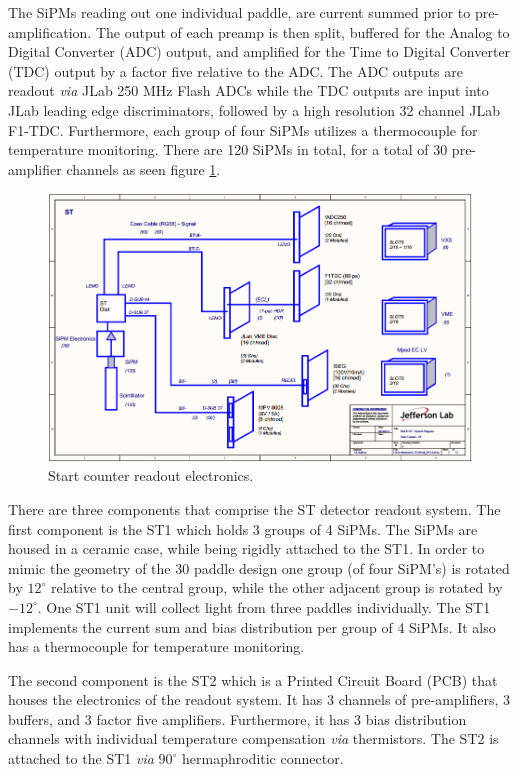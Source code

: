 The SiPMs reading out one individual paddle, are current summed prior to pre-amplification.  The output of each preamp is then split, buffered for the Analog to Digital Converter (ADC) output, and amplified for the Time to Digital Converter (TDC) output by a factor five relative to the ADC.  The ADC outputs are readout \emph{via} JLab 250 MHz Flash ADCs while the TDC outputs are input into JLab leading edge discriminators, followed by a high resolution 32 channel JLab F1-TDC.  Furthermore, each group of four SiPMs utilizes a thermocouple for temperature monitoring. There are 120 SiPMs in total, for a total of 30 pre-amplifier channels as seen figure \ref{fig:Start Counter Electronics}.
\begin{figure}[!htb]
	\centering
	\includegraphics[width=1.0\columnwidth]{design/figs/ST_Electronics}
	\caption[Start counter readout electronics]{Start counter readout electronics.}
	\label{fig:Start Counter Electronics}
\end{figure}

There are three components that comprise the ST detector readout system.  The first component is the ST1 which holds 3 groups of 4 SiPMs.  The SiPMs are housed in a ceramic case, while being rigidly attached to the ST1.  In order to mimic the geometry of the 30 paddle design one group (of four SiPM's) is rotated by $12^{\circ}$ relative to the central group, while the other adjacent group is rotated by $-12^{\circ}$.  One ST1 unit will collect light from three paddles individually.  The ST1 implements the current sum and bias distribution per group of 4 SiPMs.  It also has a thermocouple for temperature monitoring.  

The second component is the ST2 which is a Printed Circuit Board (PCB) that houses the electronics of the readout system.  It has 3 channels of pre-amplifiers, 3 buffers, and 3 factor five amplifiers.  Furthermore, it has 3 bias distribution channels with individual temperature compensation \emph{via} thermistors.  The ST2 is attached to the ST1 \emph{via} $90^{\circ}$ hermaphroditic connector.  

